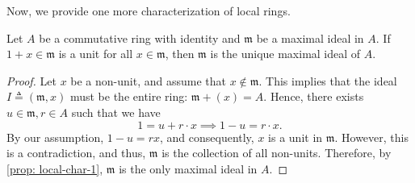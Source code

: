 Now, we provide one more characterization of local rings. 
\begin{proposition}\label{prop: local-char-2}
    Let $A$ be a commutative ring with identity and $\mathfrak{m}$ be a maximal ideal in $A$. If $1+x \in \mathfrak{m}$ is a unit for all $x \in \mathfrak{m}$, then $\mathfrak{m}$ is the unique maximal ideal of $A$.
\end{proposition}
\begin{proof}
    Let $x$ be a non-unit, and assume that $x \notin \mathfrak{m}$. This implies that the ideal $I\triangleq(\mathfrak{m}, x)$ must be the entire ring: $\mathfrak{m}+(x)=A$. Hence, there exists $u \in \mathfrak{m}, r \in A$ such that we have
    \[1 = u+r\cdot x \implies 1-u = r\cdot x.\]
    By our assumption, $1-u = rx$, and consequently, $x$ is a unit in $\mathfrak{m}$. However, this is a contradiction, and thus, $\mathfrak{m}$ is the collection of all non-units. Therefore, by \cref{prop: local-char-1}, $\mathfrak{m}$ is the only maximal ideal in $A$.
\end{proof}

